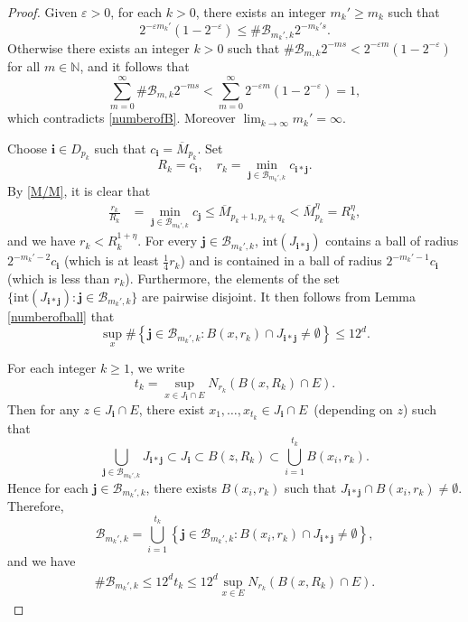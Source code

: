\documentclass[12pt]{amsart}
\numberwithin{equation}{section}
\theoremstyle{plain}
\theoremstyle{remark}
\theoremstyle{definition}
\newcommand{\om}{\overline{M}}
\newcommand{\N}{\mathbb{N}}
\newcommand{\iii}{\mathbf{i}}
\newcommand{\jjj}{\mathbf{j}}
\newcommand{\eps}{\varepsilon}
\renewcommand{\ge}{\geqslant}
\renewcommand{\le}{\leqslant}
\renewcommand{\geq}{\geqslant}
\begin{document}
\begin{proof}
		Given $\eps > 0$, for each $k > 0$, there exists an integer $m_k' \ge m_k$ such that
		\begin{equation}\label{numberofB1}
			2^{-\eps m_k'}(1-2^{-\eps})\le \#\mathcal{B}_{m_k',k}2^{-m_k's}.
		\end{equation}
	Otherwise  there exists an integer $k>0$ such that $\#\mathcal{B}_{m,k}2^{-ms}<2^{-\eps m}(1-2^{-\eps})$ for all $ m\in \N$, and it follows that 
		\[
		\sum_{m=0}^{\infty}\#\mathcal{B}_{m,k}2^{-ms}<\sum_{m=0}^{\infty}2^{-\eps m}(1-2^{-\eps})=1,
		\]
		which 	contradicts \eqref{numberofB}.  Moreover $	\lim_{k\to\infty}m_k'=\infty. $
		
	    Choose $\iii\in D_{p_k}$ such that $c_\iii=\om_{p_k}$. Set
		\[
		R_k=c_{\iii},\quad r_k=\min_{\jjj\in \mathcal{B}_{m_k',k}}c_{\iii*\jjj}.
		\]
		By \eqref{M/M},  it is clear that
		\begin{align*}
			\frac{r_k}{R_k}&=\min_{\jjj\in \mathcal{B}_{m_k',k}}c_{\jjj} \le {\om_{p_k+1,p_k+q_k}} < \om_{p_{k}}^\eta = R_k^{\eta},
		\end{align*}
		and we have   $r_k< R_k^{1+\eta}$. For every $\jjj \in \mathcal{B}_{m_k',k}$, $\mbox{int}(J _{\iii*\jjj})$ contains a ball of    radius $2^{-m_k'-2} c_{\iii}$ (which is at least $\frac14 r_k$) and is contained in a ball of radius $2^{-m_k'-1} c_{\iii}$ (which is less than $r_k$).    Furthermore, the elements of the set $\{\mbox{int}(J _{\iii*\jjj}):\jjj \in \mathcal{B}_{m_k',k}\}$ are pairwise disjoint.  
		It then follows from Lemma \ref{numberofball} that
		\[
		\sup_{x}\#\left\{\jjj\in \mathcal{B}_{m_k',k}:B(x,r_k)\cap J_{\iii*\jjj}\neq \emptyset\right\}\le 12^d.
		\]
		
		For each integer $k\geq 1$, we write
		\[
		t_k=\sup_{x\in J_{\iii}\cap E}N_{r_k}\left(B(x,R_k)\cap E\right).
		\]
		Then for any $z\in J_{\iii}\cap E$, there exist $x_1,\ldots,x_{t_k}\in J_\iii\cap E$\ (depending on $z$) such that
		\[
		\bigcup_{\jjj\in \mathcal{B}_{m_k',k}}J_{\iii*\jjj}\subset J_{\iii}\subset B(z,R_k)\subset \bigcup_{i=1}^{t_k}B(x_i,r_k).
		\]
		Hence for each $\jjj\in \mathcal{B}_{m_k',k}$, there exists  $B(x_i,r_k)$ such that $J_{\iii*\jjj}\cap B(x_i,r_k)\neq \emptyset$. Therefore,
		\[
		\mathcal{B}_{m_k',k}=\bigcup_{i=1}^{t_k}\left\{\jjj\in \mathcal{B}_{m_k',k}:B(x_i,r_k)\cap J_{\iii*\jjj}\neq \emptyset\right\}, 
		\]
		and we have 
		\begin{align}\label{numberofB2}
			\#\mathcal{B}_{m_k',k}\le12^d t_k\le 12^d \sup_{x\in E}N_{r_k}\left(B(x,R_k)\cap E\right).
		\end{align}
		

\end{proof}
\end{document}
